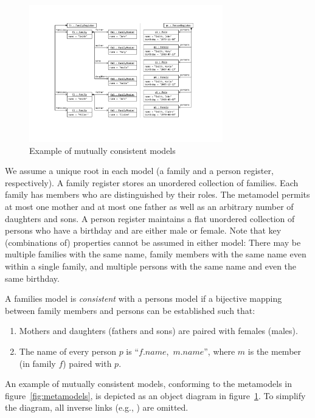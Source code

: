 \begin{figure}[tb!]
	\centering
	\includegraphics[width=0.75\textwidth]{diagrams/f2p-case/Models}
	\caption{Example of mutually consistent models}
	\label{fig:models}
\end{figure}

We assume a unique root in each model (a family and a person register, respectively). 
A family register stores an unordered collection of families. 
Each family has members who are distinguished by their roles. 
The metamodel permits at most one mother and at most one father as well as an arbitrary number of daughters and sons. 
A person register maintains a flat unordered collection of persons who have a birthday and are either male or female. 
Note that key (combinations of) properties cannot be assumed in either model: There may be multiple families with the same name, family members with the same name even within a single family, and multiple persons with the same name and even the same birthday. 

A families model is \emph{consistent} with a persons model if a bijective mapping between family members and persons can be established such that:

\begin{enumerate}
	\item  Mothers and daughters (fathers and sons) are paired with females (males).
	\item  The name of every person $p$ is ``$f.name$,~$m.name$'', where $m$ is the member (in family $f$) paired with $p$.
\end{enumerate}

An example of mutually consistent models, conforming to the metamodels in figure~\ref{fig:metamodels}, is depicted as an object diagram in figure~\ref{fig:models}. 
To simplify the diagram, all inverse links (e.g., ) are omitted.

